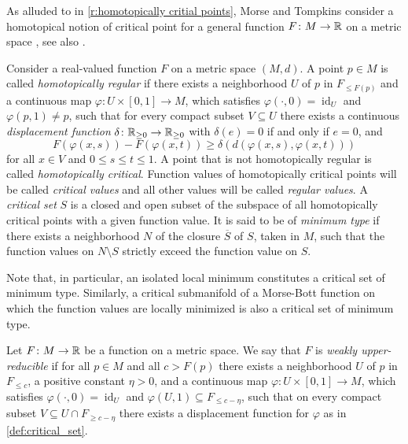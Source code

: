 As alluded to in \cref{r:homotopically critial points}, Morse and Tompkins consider a homotopical notion of critical point for a general function $F \colon M \to \mathbb{R}$ on a metric space \cite[p.~445]{Morse.1939}, see also \cite{Morse.1943}.

\begin{defi}
\label{def:critical_set}
	Consider a real-valued function $F$ on a metric space $(M,d)$.
	A point $p \in M$ is called \emph{homotopically regular} if there exists a neighborhood $U$ of $p$ in $F_{\leq F(p)}$ and a continuous map $\varphi \colon U \times [0,1] \to M$, which satisfies $\varphi(\cdot, 0) = \operatorname{id}_U$ and $\varphi(p,1) \neq p$, such that for every compact subset $V \subseteq U$ there exists a continuous \emph{displacement function} $\delta \colon \mathbb{R}_{\geq 0} \to \mathbb{R}_{\geq 0}$ with
	$\delta(e) = 0$ if and only if $e = 0$, and
	\[
	F(\varphi(x,s)) - F(\varphi(x,t)) \geq \delta(d(\varphi(x,s),\varphi(x,t)))
	\]
	for all $x \in V$ and $0 \leq s \leq t \leq 1$.
	A point that is not homotopically regular is called \emph{homotopically critical}.
	Function values of homotopically critical points will be called \emph{critical values} and all other values will be called \emph{regular values}.
	A \emph{critical set} $S$ is a closed and open subset of the subspace of all homotopically critical points with a given function value.
	It is said to be of \emph{minimum type} if there exists a neighborhood $N$ of the closure $\overline{S}$ of $S$, taken in $M$, such that the function values on $N \setminus S$ strictly exceed the function value on $S$.
\end{defi}

Note that, in particular, an isolated local minimum constitutes a critical set of minimum type. Similarly, a critical submanifold of a Morse-Bott function on which the function values are locally minimized is also a critical set of minimum type.

\begin{defi}
\label{def:upper_reducible}
	Let $F \colon M \to \mathbb{R}$ be a function on a metric space.
	We say that $F$ is \emph{weakly upper-reducible} if for all $p \in M$ and all $c > F(p)$ there exists a neighborhood $U$ of $p$ in $F_{\leq c}$, a positive constant $\eta > 0$, and a continuous map $\varphi \colon U \times [0,1] \to M$, which satisfies $\varphi(\cdot, 0) = \operatorname{id}_U$ and $\varphi(U,1) \subseteq F_{\leq c-\eta}$, such that on every compact subset $V \subseteq U \cap F_{\geq c - \eta}$ there exists a displacement function for $\varphi$ as in \cref{def:critical_set}.
\end{defi}

